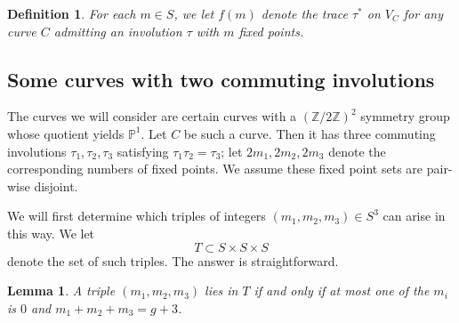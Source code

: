 \documentclass[reqno]{amsart}
\theoremstyle{plain}
\newtheorem{lemma}[theorem]{Lemma}
\newtheorem{definition}[theorem]{Definition}
\renewcommand{\P}{\mathbb{P}}
\newcommand{\Z}{\mathbb{Z}}
\begin{document}
\begin{definition}
  \label{def:functionf} For each $m \in S$, we let $f(m)$ denote the trace
  $\tau^{*}$ on $V_{C}$ for any curve $C$ admitting an involution $\tau$ with
  $m$ fixed points.
\end{definition}

\subsection{Some curves with two commuting involutions} The curves we will consider are certain
curves with a $(\Z/2\Z)^{2}$ symmetry group whose quotient yields $\P^{1}$.  Let $C$ be
such a curve. Then it has three commuting involutions $\tau_1, \tau_2, \tau_3$
satisfying $\tau_1 \tau_2 = \tau_3$; 
let $2m_1, 2m_2, 2m_3$ denote the corresponding numbers of fixed points. We
assume these fixed point sets are pair-wise disjoint. 
 
We will first determine which triples of integers $(m_1, m_2, m_3) \in S^{3}$ can arise in
this way. We let \[T \subset S\times S \times S\] denote the set of such triples.  The answer is straightforward.   

\begin{lemma}
  \label{lemma:triples} A triple $(m_1, m_2, m_3)$ lies in $T$ if and only if at
  most one of the $m_i$ is $0$ and $m_1 + m_2 + m_3 = g+3$. 
\end{lemma}
\end{document}
